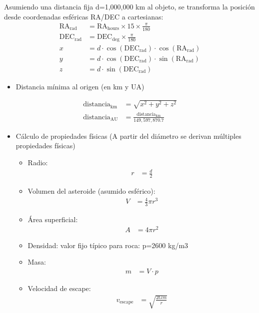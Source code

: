 \documentclass[12pt]{article}
\begin{document}
Asumiendo una distancia fija d=1,000,000 km al objeto, se transforma la posición desde coordenadas esféricas RA/DEC a cartesianas:
\begin{align*}
  \text{RA}_{\text{rad}} &= \text{RA}_{\text{hours}} \times 15 \times \frac{\pi}{180} \\
  \text{DEC}_{\text{rad}} &= \text{DEC}_{\text{deg}} \times \frac{\pi}{180} \\
  x &= d \cdot \cos(\text{DEC}_{\text{rad}}) \cdot \cos(\text{RA}_{\text{rad}}) \\
  y &= d \cdot \cos(\text{DEC}_{\text{rad}}) \cdot \sin(\text{RA}_{\text{rad}}) \\
  z &= d \cdot \sin(\text{DEC}_{\text{rad}})
\end{align*}

\begin{itemize}
  \item Distancia mínima al origen (en km y UA)
\end{itemize}

\begin{align*}
  \text{distancia}_{\text{km}} &= \sqrt{x^2 + y^2 + z^2} \\
  \text{distancia}_{\text{AU}} &= \frac{\text{distancia}_{\text{km}}}{149{,}597{,}870.7}
\end{align*}

\begin{itemize}
  \item Cálculo de propiedades físicas (A partir del diámetro se derivan múltiples propiedades físicas)
  \begin{itemize}
    \item Radio:
      \begin{align*}
        r &= \frac{d}{2}
      \end{align*}
    \item Volumen del asteroide (asumido esférico):
      \begin{align*}
        V &= \frac{4}{3} \pi r^3
      \end{align*}
    \item Área superficial:
      \begin{align*}
        A &= 4 \pi r^2
      \end{align*}
    \item Densidad: valor fijo típico para roca: p=2600 kg/m3
    \item Masa:
      \begin{align*}
        m &= V \cdot p
      \end{align*}
    \item Velocidad de escape:
      \begin{align*}
        v_{\text{escape}} &= \sqrt{\frac{2 G m}{r}}
      \end{align*}
  \end{itemize}
\end{itemize}
\end{document}
